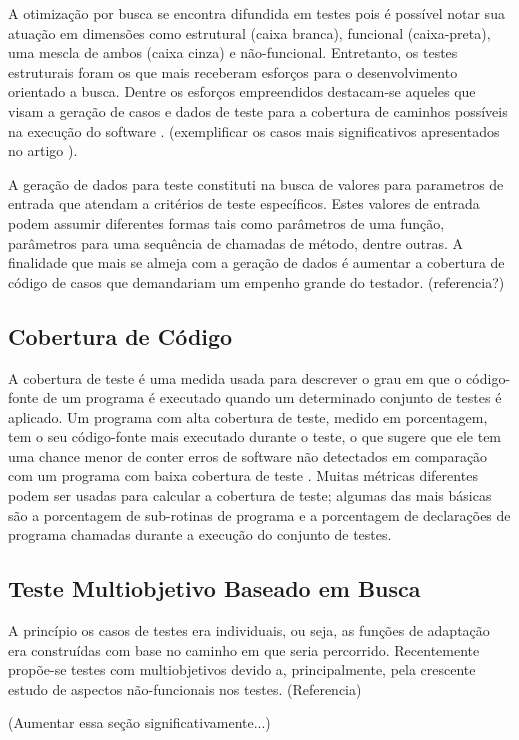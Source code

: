 A otimização por busca se encontra difundida em testes pois é possível notar sua atuação em dimensões como estrutural (caixa branca), funcional (caixa-preta), uma mescla de ambos (caixa cinza) e não-funcional.  Entretanto, os testes estruturais foram os que mais receberam esforços para o desenvolvimento orientado a busca. Dentre os esforços empreendidos destacam-se aqueles que visam a geração de casos e dados de teste para a cobertura de caminhos possíveis na execução do software \cite{khari2017extensive}. (exemplificar os casos mais significativos apresentados no artigo \cite{khari2017extensive}).

A geração de dados para teste constituti na busca de valores para parametros de entrada que atendam a critérios de teste específicos. Estes valores de entrada podem assumir diferentes formas tais como parâmetros de uma função, parâmetros para uma sequência de chamadas de método, dentre outras. A finalidade que mais se almeja com a geração de dados é aumentar a cobertura de código de casos que demandariam um empenho grande do testador. (referencia?)

\subsection{Cobertura de Código}

A cobertura de teste é uma medida usada para descrever o grau em que o código-fonte de um programa é executado quando um determinado conjunto de testes é aplicado. Um programa com alta cobertura de teste, medido em porcentagem, tem o seu código-fonte mais executado durante o teste, o que sugere que ele tem uma chance menor de conter erros de software não detectados em comparação com um programa com baixa cobertura de teste \cite{yang2009survey}. Muitas métricas diferentes podem ser usadas para calcular a cobertura de teste; algumas das mais básicas são a porcentagem de sub-rotinas de programa e a porcentagem de declarações de programa chamadas durante a execução do conjunto de testes.

\subsection{Teste Multiobjetivo Baseado em Busca}

A princípio os casos de testes era individuais, ou seja, as funções de
adaptação era construídas com base no caminho em que seria percorrido.
Recentemente propõe-se testes com multiobjetivos devido a, principalmente, pela
crescente estudo de aspectos não-funcionais nos testes. (Referencia)

(Aumentar essa seção significativamente...)












